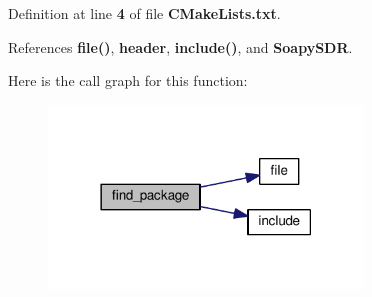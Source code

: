 Definition at line {\bf 4} of file {\bf C\+Make\+Lists.\+txt}.



References {\bf file()}, {\bf header}, {\bf include()}, and {\bf Soapy\+S\+DR}.



Here is the call graph for this function\+:
\nopagebreak
\begin{figure}[H]
\begin{center}
\leavevmode
\includegraphics[width=237pt]{d5/d22/soapysdr_2docs_2CMakeLists_8txt_af979435f41367991e862e3848a31c266_cgraph}
\end{center}
\end{figure}


